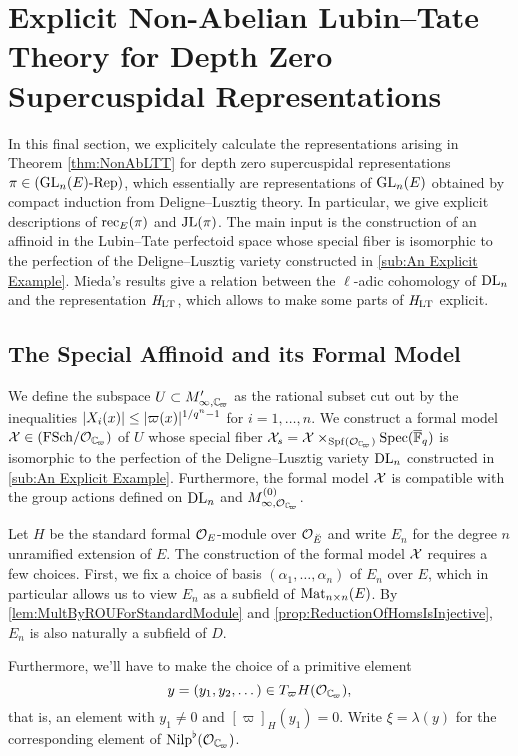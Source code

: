 \documentclass[../main.tex]{subfiles}
\begin{document}
\section{Explicit Non-Abelian Lubin--Tate Theory for Depth Zero Supercuspidal
Representations} %
\label{sec:Explicit Non-Abelian Lubin-Tate Theory for Depth Zero Supercuspidal Representations}
In this final section, we explicitely calculate the representations
arising in Theorem \ref{thm:NonAbLTT} for depth zero supercuspidal
representations $\pi \in {({\operatorname{GL}_n(E)}\textnormal-\allowbreak\mathrm{Rep})}$, which essentially are representations
of $\operatorname{GL}_n(E)$
obtained by compact induction from Deligne--Lusztig theory. In
particular, we give explicit descriptions of $\mathrm{rec}_E(\pi)$ and $\mathrm{JL}(\pi)$. 
The main input is the construction of an affinoid in the Lubin--Tate perfectoid
space whose special fiber is isomorphic to the perfection of the 
Deligne--Lusztig variety constructed in  \ref{sub:An Explicit Example}.
Mieda's results give a relation between the $\ell$-adic cohomology of $\mathrm{DL}_n$
and the representation $\mathit H_{\mathrm{LT}}$, which allows to make some parts of $\mathit H_{\mathrm{LT}}$
explicit.

\subsection{The Special Affinoid and its Formal Model} %
\label{sub:The Special Affinoid}
We define the subspace $U \subset M'_{\infty,\Cp}$ as the rational
subset cut out by the inequalities $\lvert X_i(x) \rvert \leq \lvert \varpi(x) \rvert^{1/q^n-1}$ for
$i = 1, \dots, n$. We construct a formal model $\cX \in \FSchOver {\cO_{\Cp}}$
of $U$ whose special fiber $\cX_s = 
\cX \times_{\spf(\cO_{\Cp})}\spec(\bar \FF_q)$ is isomorphic to the perfection of the
Deligne--Lusztig variety $\mathrm{DL}_n$ constructed in  \ref{sub:An Explicit Example}.
Furthermore, the formal model $\mathcal{X}$ is compatible with the group actions
defined on $\mathrm{DL}_n$ and $M_{\infty, \cO_\Cp}^{(0)}$. 

Let $H$ be the standard formal $\mathcal{O}_E$-module over $\mathcal{O}_{\breve {E}}$ and write
$E_n$ for the degree $n$ unramified extension of $E$. 
The construction of the formal model $\mathcal{X}$ requires a few choices. 
First, we fix a choice of basis $(\alpha_1, \dots, \alpha_n)$ of $E_n$ over $E$, 
which in particular allows us to view $E_n$ as a subfield of $\operatorname{Mat}_{n \times n}(E)$. 
By \cref{lem:MultByROUForStandardModule} and 
\cref{prop:ReductionOfHomsIsInjective}, $E_n$ is also naturally a subfield of
$D$.

Furthermore, we'll have to make the choice of a primitive element 
$$y = (y_1, y_2, \dots) \in T_\varpi H(\cO_\Cp),$$ that is,
an element with $y_1 \neq 0$ and $[\varpi]_H(y_1) = 0$. Write $\xi = \lambda(y)$ 
for the corresponding element of $\Nilp^\flat(\cO_\Cp)$. 
\end{document}
